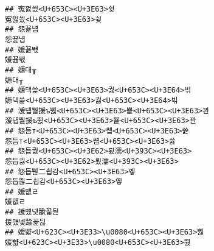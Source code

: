 \documentclass[]{article}
\begin{document}
\begin{verbatim}
## 寃껋씠<U+653C><U+3E63>슂                                                                                                                                                                                         寃껋씠<U+653C><U+3E63>슂
## 怨꾩냽                                                                                                                                                                                                                 怨꾩냽
## 媛꾪뙋                                                                                                                                                                                                                 媛꾪뙋
## 嫄대┰                                                                                                                                                                                                                 嫄대┰
## 嫄댁쓽<U+653C><U+3E63>궗<U+653C><U+3E64>빆                                                                                                                                                                 嫄댁쓽<U+653C><U+3E63>궗<U+653C><U+3E64>빆
## 湲덉뿰援ъ뿭<U+653C><U+3E63>뿉<U+653C><U+3E63>꽌                                                                                                                                                     湲덉뿰援ъ뿭<U+653C><U+3E63>뿉<U+653C><U+3E63>꽌
## 怨듬т<U+653C><U+3E63>썝<U+653C><U+3E63>쓣                                                                                                                                                                 怨듬т<U+653C><U+3E63>썝<U+653C><U+3E63>쓣
## 怨듭궗<U+653C><U+3E62>룄濡<U+393C><U+3E63>                                                                                                                                                                 怨듭궗<U+653C><U+3E62>룄濡<U+393C><U+3E63>
## 怨듭쁺二쇱감<U+653C><U+3E63>옣                                                                                                                                                                             怨듭쁺二쇱감<U+653C><U+3E63>옣
## 媛먮ㄹ                                                                                                                                                                                                                 媛먮ㄹ
## 援먰넻踰꾩뒪                                                                                                                                                                                                     援먰넻踰꾩뒪
## 媛뺣<U+623C><U+3E33>\u0080<U+653C><U+3E63>뿭                                                                                                                                                             媛뺣<U+623C><U+3E33>\u0080<U+653C><U+3E63>뿭

\end{verbatim}
\end{document}

